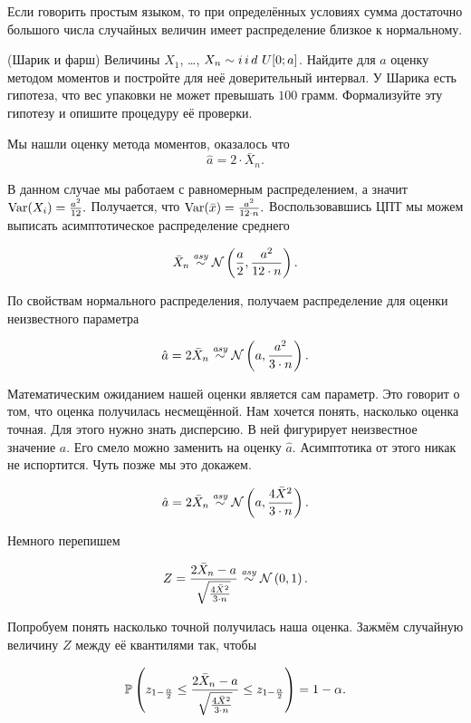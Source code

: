 \documentclass[12pt, a4paper, oneside]{article}
\begin{document}
Если говорить простым языком, то при определённых условиях сумма достаточно большого числа случайных величин имеет распределение близкое к нормальному. 

\begin{problem}{(Шарик и фарш)}
Величины $X_1$, \ldots, $X_n \sim i\,i\,d\,\, U[0;a]$. Найдите для $a$ оценку методом моментов и постройте для неё доверительный интервал. У Шарика есть гипотеза, что вес упаковки не может превышать $100$ грамм. Формализуйте эту гипотезу и опишите процедуру её проверки. 
\end{problem}

\begin{sol}
Мы нашли оценку метода моментов, оказалось что 
\[ \hat{a} = 2 \cdot \bar{X}_{n}. \]

В данном случае мы работаем с равномерным распределением, а значит $\operatorname{Var}(X_i) = \frac{a^2}{12}.$ Получается, что $\operatorname{Var}(\bar x) = \frac{a^2}{12 \cdot n}.$ Воспользовавшись ЦПТ мы можем выписать асимптотическое распределение среднего 

\[\bar{X}_n \overset{\text{\textit{asy}}}{\sim} \mathcal{N} \left(\frac{a}{2}, \frac{a^2}{12 \cdot n} \right).\] 

По свойствам нормального распределения, получаем распределение для оценки неизвестного параметра

\[\hat{a}= 2 \bar{X}_{n} \overset{\text{\textit{asy}}}{\sim} \mathcal{N} \left(a, \frac{a^2}{3 \cdot n} \right).\] 

Математическим ожиданием нашей оценки является сам параметр. Это говорит о том, что оценка получилась несмещённой. Нам хочется понять, насколько оценка точная. Для этого нужно знать дисперсию. В ней фигурирует неизвестное значение $a$. Его смело можно заменить на оценку $\hat{a}$. Асимптотика от этого никак не испортится. Чуть позже мы это докажем. 

\[\hat{a}= 2 \bar{X}_{n} \overset{\text{\textit{asy}}}{\sim} \mathcal{N} \left(a, \frac{4 \bar{X}^2}{3 \cdot n} \right).\] 

Немного перепишем 

\[Z = \frac{ 2 \bar{X}_{n} - a}{\sqrt{\frac{4 \bar{X}^2}{3 \cdot n}} } \overset{\text{\textit{asy}}}{\sim} \mathcal{N} \left(0, 1 \right).\] 

Попробуем понять насколько точной получилась наша оценка. Зажмём случайную величину $Z$ между её квантилями так, чтобы 

$$
\mathbb{P} \left( z_{1 - \frac{\alpha}{2}} \le \frac{ 2 \bar{X}_{n} - a}{\sqrt{\frac{4 \bar{X}^2}{3 \cdot n}} } \le z_{1 - \frac{\alpha}{2}} \right) = 1 - \alpha.
$$


\end{sol}
\end{document}
